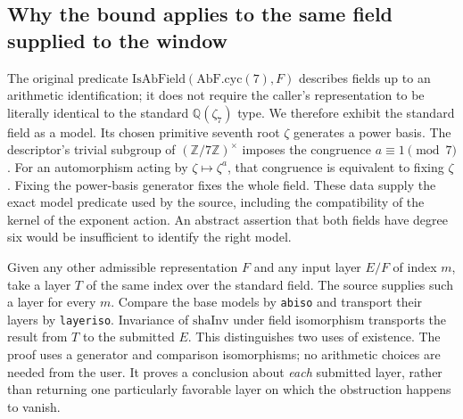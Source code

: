 \documentclass[12pt,letterpaper]{article}
\begin{document}
\subsection{Why the bound applies to the same field supplied to the window}

The original predicate \(\mathrm{IsAbField}(\mathrm{AbF.cyc}(7),F)\) describes fields up to an arithmetic identification; it does not require the caller's representation to be literally identical to the standard \(\mathbb Q(\zeta_7)\) type. We therefore exhibit the standard field as a model. Its chosen primitive seventh root \(\zeta\) generates a power basis. The descriptor's trivial subgroup of \((\mathbb Z/7\mathbb Z)^\times\) imposes the congruence \(a\equiv1\pmod7\). For an automorphism acting by \(\zeta\mapsto\zeta^a\), that congruence is equivalent to fixing \(\zeta\). Fixing the power-basis generator fixes the whole field. These data supply the exact model predicate used by the source, including the compatibility of the kernel of the exponent action. An abstract assertion that both fields have degree six would be insufficient to identify the right model.

Given any other admissible representation \(F\) and any input layer \(E/F\) of index \(m\), take a layer \(T\) of the same index over the standard field. The source supplies such a layer for every \(m\). Compare the base models by \texttt{abiso} and transport their layers by \texttt{layeriso}. Invariance of \(\mathrm{shaInv}\) under field isomorphism transports the result from \(T\) to the submitted \(E\). This distinguishes two uses of existence. The proof uses a generator and comparison isomorphisms; no arithmetic choices are needed from the user. It proves a conclusion about \emph{each} submitted layer, rather than returning one particularly favorable layer on which the obstruction happens to vanish.
\end{document}
